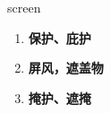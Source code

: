 
\begin{frame}
{\huge screen}
\begin{center}
\begin{enumerate}\Large
  \item \textbf{保护、庇护}
  \item \textbf{屏风，遮盖物}
  \item \textbf{掩护、遮掩}
\end{enumerate}
\end{center}
\end{frame}
